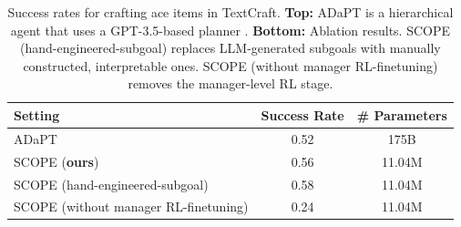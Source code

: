 \begin{table}
\centering
\caption{Success rates for crafting ace items in TextCraft. \textbf{Top:} ADaPT \citep{PrasadKHCSBK2024} is a hierarchical agent that uses a GPT-3.5-based planner \citep{BrownMRSSKD2020}. \textbf{Bottom:} Ablation results. SCOPE (hand-engineered-subgoal) replaces LLM-generated subgoals with manually constructed, interpretable ones. SCOPE (without manager RL-finetuning) removes the manager-level RL stage.
}
\label{tab:performance}
\begin{tabular}{l c c}
\toprule
\textbf{Setting} & \textbf{Success Rate} & \textbf{\# Parameters} \\
\midrule
ADaPT \citep{PrasadKHCSBK2024} & 0.52 & 175B \\
SCOPE (\textbf{ours})  & 0.56 & 11.04M \\
\midrule
SCOPE (hand-engineered-subgoal) & 0.58 & 11.04M \\
SCOPE (without manager RL-finetuning) & 0.24 & 11.04M \\
\bottomrule
\end{tabular}
\vspace{1em}  
\end{table}




